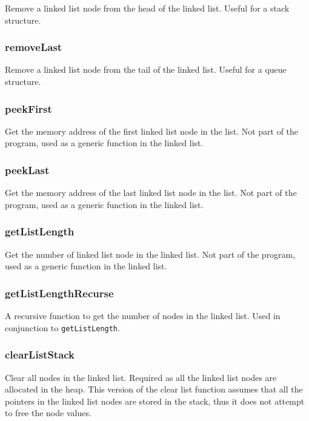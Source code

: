 \documentclass[a4paper, 12pt, titlepage]{article}
\newcommand{\code}[1]{\small\texttt{#1}\normalsize}
\begin{document}
Remove a linked list node from the head of the linked list. Useful for a
stack structure.

\subsubsection{removeLast}

Remove a linked list node from the tail of the linked list. Useful for a
queue structure.

\subsubsection{peekFirst}

Get the memory address of the first linked list node in the list. Not part of
the program, used as a generic function in the linked list.

\subsubsection{peekLast}

Get the memory address of the last linked list node in the list. Not part of
the program, used as a generic function in the linked list.

\subsubsection{getListLength}

Get the number of linked list node in the linked list. Not part of the
program, used as a generic function in the linked list.

\subsubsection{getListLengthRecurse}

A recursive function to get the number of nodes in the linked list. Used in
conjunction to \code{getListLength}.

\subsubsection{clearListStack}

Clear all nodes in the linked list. Required as all the linked list nodes are
allocated in the heap. This version of the clear list function assumes that
all the pointers in the linked list nodes are stored in the stack, thus it
does not attempt to free the node values.
\end{document}
